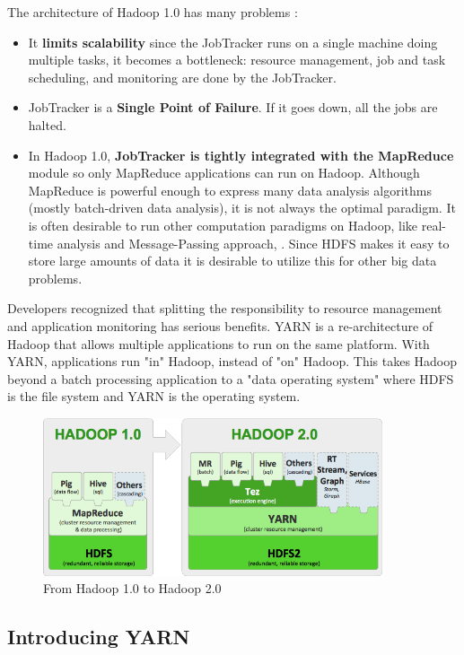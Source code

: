 \noindent The architecture of Hadoop 1.0 has many problems \cite{Hadoop1.0-problems}:
\begin{itemize}
	\item  It \textbf{limits scalability} since the JobTracker runs on a single machine doing multiple tasks, it becomes a bottleneck: resource management, job and task scheduling, and monitoring are done by the JobTracker.
	\item JobTracker is a \textbf{Single Point of Failure}. If it goes down, all the jobs are halted.
	\item In Hadoop 1.0, \textbf{JobTracker is tightly integrated with the MapReduce} module so only MapReduce applications can run on Hadoop. Although MapReduce is powerful enough to express many data analysis algorithms (mostly batch-driven data analysis), it is not always the optimal paradigm. It is often desirable to run other computation paradigms on Hadoop, like real-time analysis and Message-Passing approach, \etc. Since HDFS makes it easy to store large amounts of data it is desirable to utilize this for other big data problems.
\end{itemize}

Developers recognized that splitting the responsibility to resource management and application monitoring has serious benefits. YARN is a re-architecture of Hadoop that allows multiple applications to run on the same platform. With YARN, applications run "in" Hadoop, instead of "on" Hadoop. This takes Hadoop beyond a batch processing application to a "data operating system" where HDFS is the file system and YARN is the operating system. 

\begin{figure}[H]
	\includegraphics[width=100mm, keepaspectratio]{figures/hadoop10vs20.png}
	\centering
	\caption{From Hadoop 1.0 to Hadoop 2.0}
	\centering
\end{figure}
\fi

\subsection{Introducing YARN}

